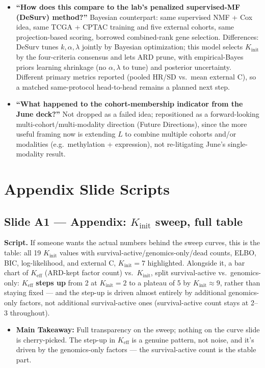 \documentclass[11pt]{article}
\newcommand{\scriptlabel}{\textbf{Script. }}
\newcommand{\sectionlabel}[1]{\textbf{#1}}
\newcommand{\key}[1]{\textcolor{keyblue}{\textbf{#1}}}        %
\begin{document}
\begin{itemize}
\item \sectionlabel{``How does this compare to the lab's penalized supervised-MF (DeSurv) method?''}
Bayesian counterpart: same supervised NMF + Cox idea, same TCGA + CPTAC training and five external
cohorts, same projection-based scoring, borrowed combined-rank gene selection. Differences: DeSurv
tunes $k,\alpha,\lambda$ jointly by Bayesian optimization; this model selects $K_\text{init}$ by the
four-criteria consensus and lets ARD prune, with empirical-Bayes priors learning shrinkage (no
$\alpha,\lambda$ to tune) and posterior uncertainty. Different primary metrics reported (pooled HR/SD
vs.\ mean external C), so a matched same-protocol head-to-head remains a planned next step.

\item \sectionlabel{``What happened to the cohort-membership indicator from the June deck?''} Not
dropped as a failed idea; repositioned as a forward-looking multi-cohort/multi-modality direction
(Future Directions), since the more useful framing now is extending $L$ to combine multiple cohorts
and/or modalities (e.g.\ methylation + expression), not re-litigating June's single-modality result.
\end{itemize}

\section*{Appendix Slide Scripts}

\subsection*{Slide A1 --- Appendix: $K_\text{init}$ sweep, full table}
\scriptlabel If someone wants the actual numbers behind the sweep curves, this is the table: all
19 $K_\text{init}$ values with survival-active/genomics-only/dead counts, ELBO, BIC, log-likelihood,
and external C, $K_\text{init}=7$ highlighted. Alongside it, a bar chart of $K_\text{eff}$ (ARD-kept
factor count) vs.\ $K_\text{init}$, split survival-active vs.\ genomics-only: $K_\text{eff}$
\key{steps up} from 2 at $K_\text{init}=2$ to a plateau of 5 by $K_\text{init}\approx9$, rather than
staying fixed --- and the step-up is driven almost entirely by additional genomics-only factors, not
additional survival-active ones (survival-active count stays at 2--3 throughout).

\begin{itemize}
\item \sectionlabel{Main Takeaway:} Full transparency on the sweep; nothing on the curve slide is
cherry-picked. The step-up in $K_\text{eff}$ is a genuine pattern, not noise, and it's driven by the
genomics-only factors --- the survival-active count is the stable part.
\end{itemize}
\end{document}
